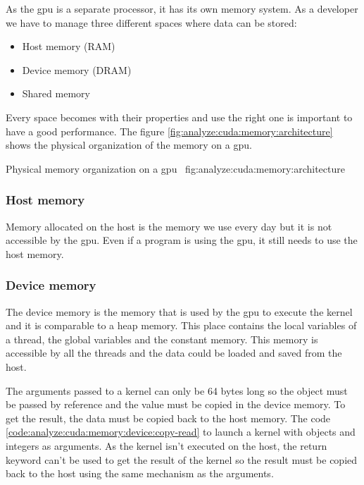 As the \acrshort{gpu} is a separate processor, it has its own memory system.
As a developer we have to manage three different spaces where data can be stored:
\begin{itemize}
    \item Host memory (RAM)
    \item Device memory (DRAM)
    \item Shared memory
\end{itemize}

Every space becomes with their properties and use the right one is important to
have a good performance.
The figure \ref{fig:analyze:cuda:memory:architecture} shows the physical
organization of the memory on a \acrshort{gpu}.

{Physical memory organization on a \acrshort{gpu}~\cite{cuda-training}}
{fig:analyze:cuda:memory:architecture}


\subsubsection{Host memory}
\label{ch:analyze:cuda:memory:host}

Memory allocated on the host is the memory we use every day but it is not
accessible by the \acrshort{gpu}.
Even if a program is using the \acrshort{gpu}, it still needs to use the host
memory.

\subsubsection{Device memory}
\label{ch:analyze:cuda:memory:device}

The device memory is the memory that is used by the \acrshort{gpu} to execute
the kernel and it is comparable to a heap memory.
This place contains the local variables of a thread, the global variables and
the constant memory.
This memory is accessible by all the threads and the data could be loaded and saved
from the host.

The arguments passed to a kernel can only be 64 bytes long so the object must be
passed by reference and the value must be copied in the device memory.
To get the result, the data must be copied back to the host memory.
The code \ref{code:analyze:cuda:memory:device:copy-read} to launch a kernel
with objects and integers as arguments.
As the kernel isn't executed on the host, the return keyword can't be used to
get the result of the kernel so the result must be copied back to the host
using the same mechanism as the arguments.

